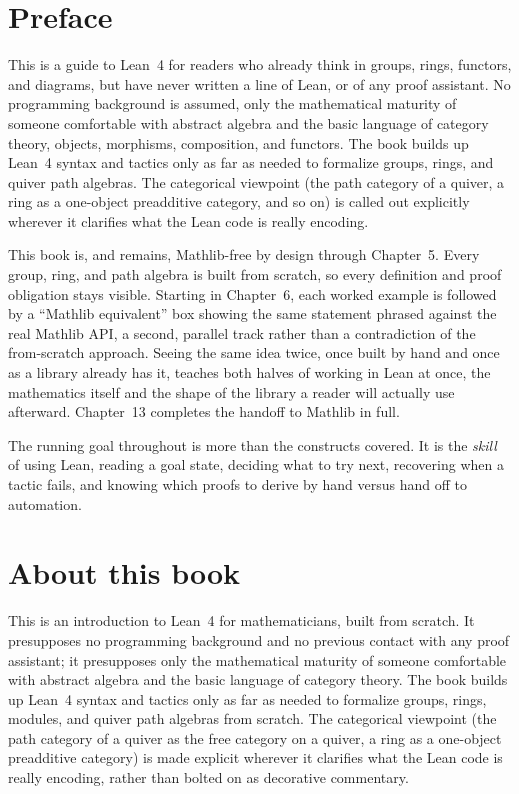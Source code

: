\chapter*{Preface}

This is a guide to Lean~4 for readers who already think in groups, rings,
functors, and diagrams, but have never written a line of Lean, or of any
proof assistant. No programming background is assumed, only the
mathematical maturity of someone comfortable with abstract algebra and the
basic language of category theory, objects, morphisms, composition, and
functors. The book builds up Lean~4 syntax and tactics only as far as
needed to formalize groups, rings, and quiver path algebras. The
categorical viewpoint (the path category of a quiver, a ring as a
one-object preadditive category, and so on) is called out explicitly
wherever it clarifies what the Lean code is really encoding.

This book is, and remains, Mathlib-free by design through Chapter~5.
Every group, ring, and path algebra is built from scratch, so every
definition and proof obligation stays visible. Starting in Chapter~6,
each worked example is followed by a ``Mathlib equivalent'' box showing
the same statement phrased against the real Mathlib API, a second,
parallel track rather than a contradiction of the from-scratch approach.
Seeing the same idea twice, once built by hand and once as a library
already has it, teaches both halves of working in Lean at once, the
mathematics itself and the shape of the library a reader will actually
use afterward. Chapter~13 completes the handoff to Mathlib in full.

The running goal throughout is more than the constructs covered. It is
the \emph{skill} of using Lean, reading a goal state, deciding what to
try next, recovering when a tactic fails, and knowing which proofs to
derive by hand versus hand off to automation.

\chapter*{About this book}
This is an introduction to Lean~4 for mathematicians, built from scratch.
It presupposes no programming background and no previous contact with any
proof assistant; it presupposes only the mathematical maturity of someone
comfortable with abstract algebra and the basic language of category
theory. The book builds up Lean~4 syntax and tactics only as far as needed
to formalize groups, rings, modules, and quiver path algebras from
scratch. The categorical viewpoint (the path category of a quiver as the
free category on a quiver, a ring as a one-object preadditive category)
is made explicit wherever it clarifies what the Lean code is really
encoding, rather than bolted on as decorative commentary.

